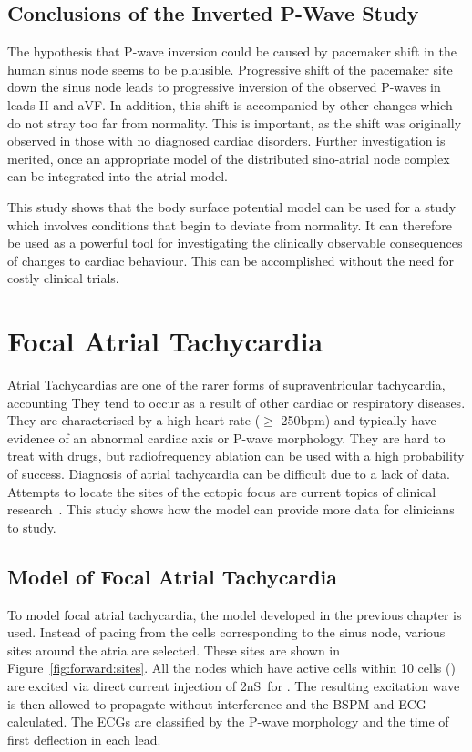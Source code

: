 \subsection{Conclusions of the Inverted P-Wave Study}

The hypothesis that P-wave inversion could be caused by pacemaker shift in the
human sinus node seems to be plausible.
Progressive shift of the pacemaker site down the sinus node leads to progressive
inversion of the observed P-waves in leads II and aVF.
In addition, this shift is accompanied by other changes which do not stray too
far from normality.
This is important, as the shift was originally observed in those with no
diagnosed cardiac disorders.
Further investigation is merited, once an appropriate model of the distributed
sino-atrial node complex can be integrated into the atrial model.

This study shows that the body surface potential model can be used for a study
which involves conditions that begin to deviate from normality.
It can therefore be used as a powerful tool for investigating the clinically
observable consequences of changes to cardiac behaviour.
This can be accomplished without the need for costly clinical trials.



\section{Focal Atrial Tachycardia}

Atrial Tachycardias are one of the rarer forms of supraventricular
tachycardia, accounting 
They tend to occur as a result of other cardiac or respiratory diseases.
They are characterised by a high heart rate ($\geq$ \unit{250}{bpm}) and
typically have evidence of an abnormal cardiac axis or P-wave morphology.
They are hard to treat with drugs, but radiofrequency ablation can be used with
a high probability of success.
Diagnosis of atrial tachycardia can be difficult due to a lack of data.
Attempts to locate the sites of the ectopic focus are current topics of clinical
research~\cite{Kistler2006,Kahn2006,Yamane2001}.
This study shows how the model can provide more data for clinicians to study.

\subsection{Model of Focal Atrial Tachycardia}

To model focal atrial tachycardia, the model developed in the previous chapter
is used.
Instead of pacing from the cells corresponding to the sinus node, various sites
around the atria are selected.
These sites are shown in Figure~\ref{fig:forward:sites}.
All the nodes which have active cells within 10 cells () are excited via
direct current injection of \unit{2}{nS}\ for .
The resulting excitation wave is then allowed to propagate without interference
and the BSPM and ECG calculated.
The ECGs are classified by the P-wave morphology and the time of first
deflection in each lead.



